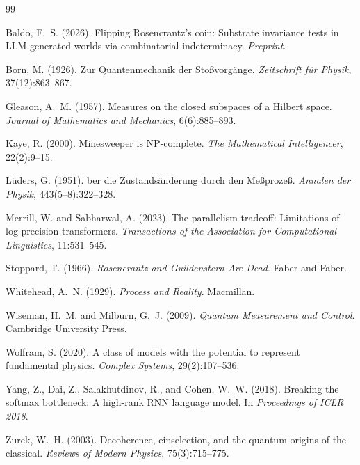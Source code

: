 \documentclass[12pt,a4paper]{article}
\theoremstyle{definition}
\theoremstyle{remark}
\begin{document}


\begin{thebibliography}{99}

Baldo, F.~S. (2026).
\newblock Flipping {R}osencrantz's coin: Substrate invariance tests in
  {LLM}-generated worlds via combinatorial indeterminacy.
\newblock \textit{Preprint}.

Born, M. (1926).
\newblock Zur {Q}uantenmechanik der {S}to{\ss}vorg{\"a}nge.
\newblock \textit{Zeitschrift f{\"u}r Physik}, 37(12):863--867.

Gleason, A.~M. (1957).
\newblock Measures on the closed subspaces of a {H}ilbert space.
\newblock \textit{Journal of Mathematics and Mechanics}, 6(6):885--893.

Kaye, R. (2000).
\newblock Minesweeper is {NP}-complete.
\newblock \textit{The Mathematical Intelligencer}, 22(2):9--15.

L{\"u}ders, G. (1951).
ber die {Z}ustands{\"a}nderung durch den {M}e{\ss}proze{\ss}.
\newblock \textit{Annalen der Physik}, 443(5--8):322--328.

Merrill, W. and Sabharwal, A. (2023).
\newblock The parallelism tradeoff: Limitations of log-precision transformers.
\newblock \textit{Transactions of the Association for Computational
  Linguistics}, 11:531--545.

Stoppard, T. (1966).
\newblock \textit{Rosencrantz and Guildenstern Are Dead}.
\newblock Faber and Faber.

Whitehead, A.~N. (1929).
\newblock \textit{Process and Reality}.
\newblock Macmillan.

Wiseman, H.~M. and Milburn, G.~J. (2009).
\newblock \textit{Quantum Measurement and Control}.
\newblock Cambridge University Press.

Wolfram, S. (2020).
\newblock A class of models with the potential to represent fundamental physics.
\newblock \textit{Complex Systems}, 29(2):107--536.

Yang, Z., Dai, Z., Salakhutdinov, R., and Cohen, W.~W. (2018).
\newblock Breaking the softmax bottleneck: A high-rank {RNN} language model.
\newblock In \textit{Proceedings of ICLR 2018}.

Zurek, W.~H. (2003).
\newblock Decoherence, einselection, and the quantum origins of the classical.
\newblock \textit{Reviews of Modern Physics}, 75(3):715--775.

\end{thebibliography}
\end{document}
